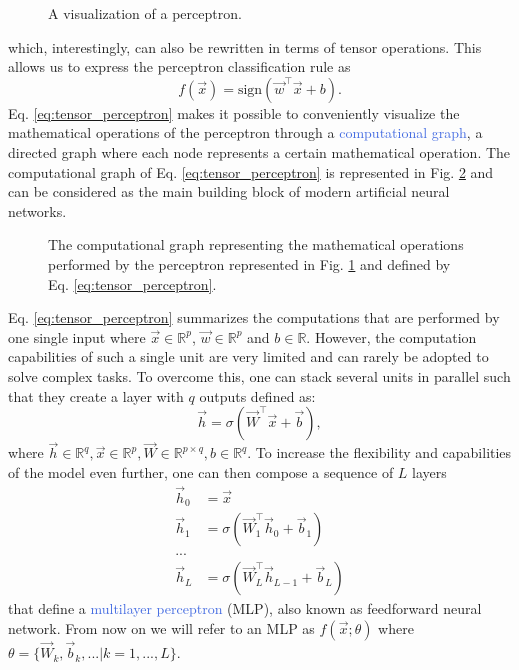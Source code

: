 \begin{figure}[ht!]
	\centering
	
\caption{A visualization of a perceptron.}
\label{fig:perceptron}
\end{figure}
\noindent which, interestingly, can also be rewritten in terms of tensor operations. This allows us to express the perceptron classification rule as 
\begin{equation}
	f(\vec{x}) = \text{sign}(\vec{w}^\intercal \vec{x} + b).
	\label{eq:tensor_perceptron}
\end{equation}
Eq. \ref{eq:tensor_perceptron} makes it possible to conveniently visualize the mathematical operations of the perceptron through a \textcolor{RoyalBlue}{computational graph}, a directed graph where each node represents a certain mathematical operation. The computational graph of Eq. \ref{eq:tensor_perceptron} is represented in Fig. \ref{fig:computational_graph_0} and can be considered as the main building block of modern artificial neural networks.
\begin{figure}[ht!]
	\centering
	
	\caption{The computational graph representing the mathematical operations performed by the perceptron represented in Fig. \ref{fig:perceptron} and defined by Eq. \ref{eq:tensor_perceptron}.}
\label{fig:computational_graph_0}
\end{figure}

Eq. \ref{eq:tensor_perceptron} summarizes the computations that are performed by one single input where $\vec{x}\in\mathds{R}^{p}$, $\vec{w}\in\mathds{R}^{p}$ and $b\in\mathds{R}$. However, the computation capabilities of such a single unit are very limited and can rarely be adopted to solve complex tasks. To overcome this, one can stack several units in parallel such that they create a layer with $q$ outputs defined as:
\begin{equation}
	\vec{h} = \sigma(\vec{W}^\intercal\vec{x}+\vec{b}),
\end{equation}
where $\vec{h}\in\mathds{R}^{q},\vec{x}\in\mathds{R}^{p},\vec{W}\in\mathds{R}^{p\times q},b\in\mathds{R}^{q}$. To increase the flexibility and capabilities of the model even further, one can then compose a sequence of $L$ layers
\begin{equation}
	\begin{split}
		\vec{h}_0 & = \vec{x} \\ 
		\vec{h}_1 & = \sigma(\vec{W}^{\intercal}_{1}\vec{h}_0 + \vec{b}_1) \\ 
	... \\
		\vec{h}_L & = \sigma(\vec{W}^{\intercal}_{L}\vec{h}_{L-1}+\vec{b}_{L})
	\end{split}
\end{equation}
that define a \textcolor{RoyalBlue}{multilayer perceptron} (MLP), also known as feedforward neural network. From now on we will refer to an MLP as $f(\vec{x};\theta)$ where $\theta=\{\vec{W}_k,\vec{b}_k,...|k=1,...,L\}$. 

